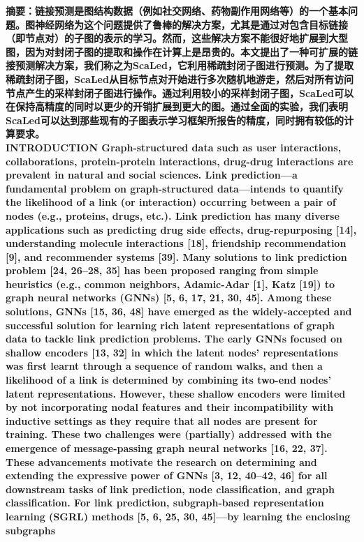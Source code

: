 \documentclass{article}
\begin{document}
\textbf{摘要：链接预测是图结构数据（例如社交网络、药物副作用网络等）的一个基本问题。图神经网络为这个问题提供了鲁棒的解决方案，尤其是通过对包含目标链接（即节点对）的子图的表示的学习。然而，这些解决方案不能很好地扩展到大型图，因为对封闭子图的提取和操作在计算上是昂贵的。本文提出了一种可扩展的链接预测解决方案，我们称之为ScaLed，它利用稀疏封闭子图进行预测。为了提取稀疏封闭子图，ScaLed从目标节点对开始进行多次随机地游走，然后对所有访问节点产生的采样封闭子图进行操作。通过利用较小的采样封闭子图，ScaLed可以在保持高精度的同时以更少的开销扩展到更大的图。通过全面的实验，我们表明ScaLed可以达到那些现有的子图表示学习框架所报告的精度，同时拥有较低的计算要求。}\\

\textbf{INTRODUCTION
Graph-structured data such as user interactions, collaborations,
protein-protein interactions, drug-drug interactions are prevalent in
natural and social sciences. Link prediction—a fundamental problem
on graph-structured data—intends to quantify the likelihood of a
link (or interaction) occurring between a pair of nodes (e.g., proteins,
drugs, etc.). Link prediction has many diverse applications such as
predicting drug side effects, drug-repurposing [14], understanding
molecule interactions [18], friendship recommendation [9], and
recommender systems [39].
Many solutions to link prediction problem [24, 26–28, 35] has
been proposed ranging from simple heuristics (e.g., common neighbors, Adamic-Adar [1], Katz [19]) to graph neural networks (GNNs)
[5, 6, 17, 21, 30, 45]. Among these solutions, GNNs [15, 36, 48]
have emerged as the widely-accepted and successful solution for
learning rich latent representations of graph data to tackle link
prediction problems. The early GNNs focused on shallow encoders
[13, 32] in which the latent nodes’ representations was first learnt
through a sequence of random walks, and then a likelihood of a
link is determined by combining its two-end nodes’ latent representations. However, these shallow encoders were limited by not
incorporating nodal features and their incompatibility with inductive settings as they require that all nodes are present for training.
These two challenges were (partially) addressed with the emergence of message-passing graph neural networks [16, 22, 37]. These
advancements motivate the research on determining and extending
the expressive power of GNNs [3, 12, 40–42, 46] for all downstream
tasks of link prediction, node classification, and graph classification.
For link prediction, subgraph-based representation learning (SGRL)
methods [5, 6, 25, 30, 45]—by learning the enclosing subgraphs
}
\end{document}
